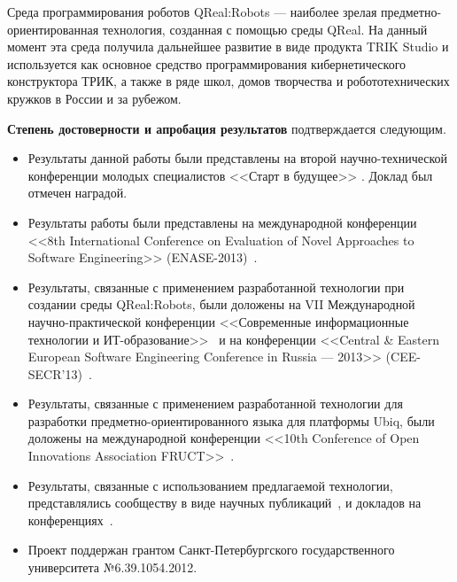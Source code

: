 Среда программирования роботов QReal:Robots --- наиболее зрелая 
предметно-ориентированная технология, созданная с помощью среды QReal. На данный 
момент эта среда получила дальнейшее развитие в виде продукта TRIK Studio и используется 
как основное средство программирования кибернетического конструктора ТРИК, а также в 
ряде школ, домов творчества и робототехнических кружков в России и за рубежом.

\textbf{Степень достоверности и апробация результатов} подтверждается следующим.
\begin{itemize}
	\item Результаты данной работы были представлены на второй 
		научно-технической конференции молодых специалистов <<Старт в будущее>> 
		\cite{kuzenkova2011metamodeling2}. Доклад был отмечен наградой.
	\item Результаты работы были представлены на международной конференции 
		<<8th International Conference on Evaluation of Novel Approaches to Software Engineering>> 
		(ENASE-2013)~.
	\item Результаты, связанные с применением разработанной технологии при 
		создании среды QReal:Robots, были доложены на VII Международной 
		научно-практической конференции <<Современные информационные технологии 
		и ИТ-образование>>~\cite{litvinov2012robots} и на конференции <<Central \& Eastern European
		Software Engineering Conference in Russia --- 2013>> (CEE-SECR'13)~\cite{terekhov2013secr}.
	\item Результаты, связанные с применением разработанной технологии для 
		разработки предметно-ориентированного языка для платформы Ubiq, были доложены 
		на международной конференции <<10th Conference of Open Innovations 
		Association FRUCT>>~\cite{bryksin2011ubiq}.
	\item Результаты, связанные с использованием предлагаемой технологии,
		представлялись сообществу в виде научных публикаций~, \cite{osechkina2010gestures, terekhov2009architecture}
		и докладов на конференциях~\cite{terekhov2013robots, kuzenkova2013refactoring,
		osechkina2012multistroke, bryksin2011qreal, kuzenkova2011metamodeling, bryksin2011robots}.
	\item Проект поддержан грантом Санкт-Петербургского государственного университета №6.39.1054.2012.
\end{itemize}

